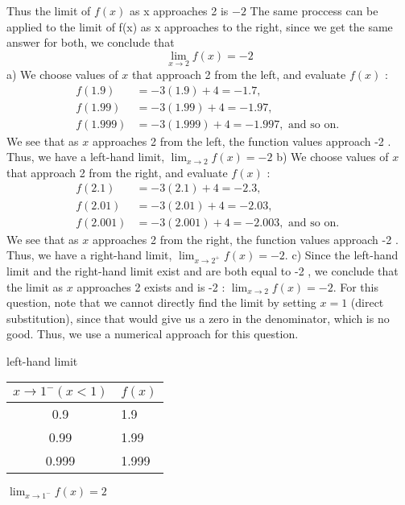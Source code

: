\documentclass{report}
\begin{document}
\noindent
Thus the limit of $f(x)$ as x approaches 2 is $-2$
\bigbreak \noindent
The same proccess can be applied to the limit of f(x) as x approaches to the right, since we get the same answer for both, we conclude that
$$\displaystyle\lim_{x\to 2}f(x) = -2$$
\bigbreak \noindet
a) We choose values of $x$ that approach 2 from the left, and evaluate $f(x)$ :
$$
\begin{aligned}
f(1.9) & =-3(1.9)+4=-1.7, \\
f(1.99) & =-3(1.99)+4=-1.97, \\
f(1.999) & =-3(1.999)+4=-1.997, \text { and so on. }
\end{aligned}
$$
We see that as $x$ approaches 2 from the left, the function values approach -2 . Thus, we have a left-hand limit, $\lim _{x \rightarrow 2} f(x)=-2$
\bigbreak 
b) We choose values of $x$ that approach 2 from the right, and evaluate $f(x)$ :
$$
\begin{aligned}
f(2.1) & =-3(2.1)+4=-2.3, \\
f(2.01) & =-3(2.01)+4=-2.03, \\
f(2.001) & =-3(2.001)+4=-2.003, \text { and so on. }
\end{aligned}
$$
We see that as $x$ approaches 2 from the right, the function values approach -2 . Thus, we have a right-hand limit, $\lim _{x \rightarrow 2^{+}} f(x)=-2$.
\bigbreak \noindent
c) Since the left-hand limit and the right-hand limit exist and are both equal to -2 , we conclude that the limit as $x$ approaches 2 exists and is -2 : $\lim _{x \rightarrow 2} f(x)=-2$.
\pagebreak
{}
\sol
\bigbreak \noindent
For this question, note that we cannot directly find the limit by setting $x = 1$ (direct substitution), since that would give us a zero in the denominator, which is no good.
\bigbreak
\noindent Thus, we use a numerical approach for this question.
\bigbreak \noindent \bigbreak \noindent
\hspace{25mm}\begin{minipage}{0.45\textwidth}
  \hspace{2em}
  left-hand limit
  \vspace{2mm}

\begin{tabular}{|c|l|}
\hline$x \rightarrow 1^{-}(x<1)$ & $f(x)$ \\
\hline 0.9 & 1.9 \\
0.99 & 1.99 \\
0.999 & 1.999 \\
\hline
\end{tabular}
\vspace{4mm}

\hspace{8mm}$\displaystyle\lim_{x\to 1^-}f(x) = 2$
\end{minipage}
\end{document}

